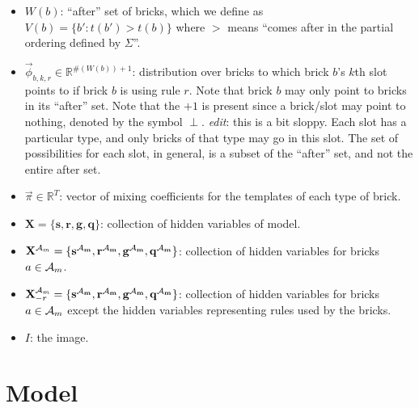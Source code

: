 \documentclass[11pt]{article}
\newcommand{\A}{{\cal A}}
\newcommand{\X}{\mathbf{X}}
\newcommand{\symb}{\Sigma}
\newcommand{\Xrm}{\X^{\Am}_{-r}}
\newcommand{\Am}{\A_{m}}
\newcommand{\Real}{\mathbb{R}}
\begin{document}
\begin{itemize}
\item $W(b)$: ``after'' set of bricks, which we define as $V(b) = \{b' : t(b') > t(b) \}$ where $>$ means ``comes after in the partial ordering defined by $\symb$''.

\item $\vec{\phi}_{b,k,r} \in \mathbb{R}^{\#(W(b))+1}$: distribution over bricks to which brick $b$'s $k$th slot points to if brick $b$ is using rule $r$. Note that brick $b$ may only point to bricks in its ``after'' set. Note that the $+1$ is present since a brick/slot may point to nothing, denoted by the symbol $\perp$. \emph{edit}: this is a bit sloppy. Each slot has a particular type, and only bricks of that type may go in this slot. The set of possibilities for each slot, in general, is a subset of the ``after'' set, and not the entire after set.

\item $\vec{\pi} \in \Real^T$: vector of mixing coefficients for the templates of each type of brick.

\item $\X = \{ \mathbf{s}, \mathbf{r}, \mathbf{g}, \mathbf{q}\}$: collection of hidden variables of model.

\item $\X^{\Am} = \{ \mathbf{s^{\Am}}, \mathbf{r^{\Am}}, \mathbf{g^{\Am}}, \mathbf{q^{\Am}} \}$: collection of hidden variables for bricks $a \in \Am$.

\item $\Xrm = \{ \mathbf{s^{\Am}}, \mathbf{r^{\Am}}, \mathbf{g^{\Am}}, \mathbf{q^{\Am}} \}$: collection of hidden variables for bricks $a \in \Am$ except the hidden variables representing rules used by the bricks.

\item $I$: the image.

\end{itemize}

\section{Model}
\end{document}
